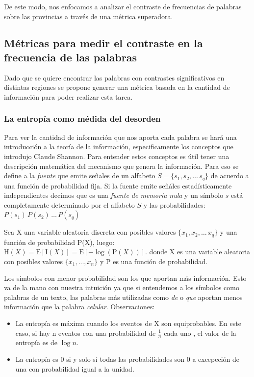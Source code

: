 
De este modo, nos enfocamos a analizar el contraste de frecuencias de palabras sobre las provincias a través de una métrica superadora.

\subsection{Métricas para medir el contraste en la frecuencia de las palabras}
Dado que se quiere encontrar las palabras con contrastes significativos en distintas 
regiones se propone generar una métrica basada en la cantidad de información 
para poder realizar esta tarea.
\subsubsection{La entropía como médida del desorden}

Para ver la cantidad de información que nos aporta cada palabra se hará una introducción a la teoría de la información, especificamente
los conceptos que introdujo Claude Shannon\cite{shannon2001mathematical}.
Para entender estos conceptos es útil tener una descripción matemática del mecanismo que genera la información. Para eso se define a 
la \textit{fuente} que emite señales de un alfabeto $ S = \{s_1, s_2, \dots\, s_q\}$ de acuerdo a una función de probabilidad fija.
Si la fuente emite señáles estadísticamente independientes decimos que es una \textit{fuente de memoria nula} y un símbolo $s$ está completamente determinado por el alfabeto $S$ y las probabilidades:
$P(s_1)\,P(s_2)\, \dots\, P(s_q)$

Sea X una variable aleatoria discreta con posibles valores $\{x_1, x_2, \dots\, x_q\}$ y una función de probabilidad P(X), luego:
${\displaystyle \mathrm {H} (X)=\mathrm {E} [\mathrm {I} (X)]=\mathrm {E} [-\log(\mathrm {P} (X))].}$
donde X es una variable aleatoria con posibles valores $\{x_1, ... , x_n\}$ y P es una función de probabilidad.

Los símbolos con menor probabilidad son los que aportan más información. Esto va de la mano con nuestra intuición ya que si entendemos a los símbolos como palabras de un texto, las palabras más utilizadas como \textit{de} o \textit{que} aportan menos información que la palabra \textit{celular}. 
Observaciones:
\begin{itemize}
    \item La entropía es máxima cuando los eventos de X son equiprobables. En este caso, si hay n eventos con una probabilidad de $\frac{1}{n}$ cada uno , el valor de la entropía es de $\log n$.
    \item La entropía es 0 si y solo sí todas las probabilidades son 0 a excepeción de una con probabilidad igual a la unidad. 
\end{itemize}

